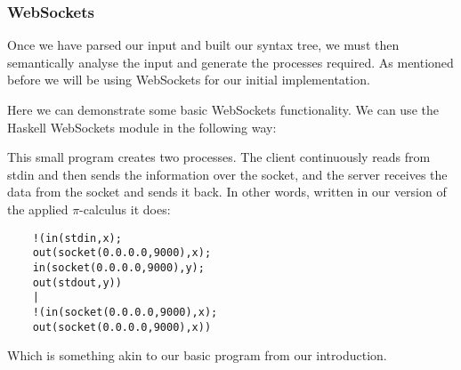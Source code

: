 \subsubsection{WebSockets}

Once we have parsed our input and built our syntax tree, we must then semantically analyse the input and generate the processes required. As mentioned before we will be using WebSockets for our initial implementation.

Here we can demonstrate some basic WebSockets functionality. We can use the Haskell WebSockets module in the following way:



This small program creates two processes. The client continuously reads from stdin and then sends the information over the socket, and the server receives the data from the socket and sends it back. In other words, written in our version of the applied $\pi$-calculus it does:
\begin{verbatim}
    !(in(stdin,x);
    out(socket(0.0.0.0,9000),x);
    in(socket(0.0.0.0,9000),y);
    out(stdout,y)) 
    |
    !(in(socket(0.0.0.0,9000),x);
    out(socket(0.0.0.0,9000),x))
\end{verbatim}

Which is something akin to our basic program from our introduction.


